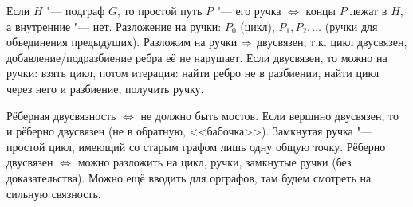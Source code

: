 	Если $H$ "--- подграф $G$, то простой путь $P$ "--- его ручка $\iff$ концы $P$ лежат в $H$, а внутренние "--- нет.
	Разложение на ручки: $P_0$ (цикл), $P_1, P_2, \dots$ (ручки для объединения предыдущих).
	Разложим на ручки $\Rightarrow$ двусвязен, т.к. цикл двусвязен, добавление/подразбиение ребра её не нарушает.
	Если двусвязен, то можно на ручки: взять цикл, потом итерация: найти ребро не в разбиении, найти цикл через него и разбиение, получить ручку.

	Рёберная двусвязность $\iff$ не должно быть мостов.
	Если вершнно двусвязен, то и рёберно двусвязен (не в обратную, <<бабочка>>).
	Замкнутая ручка "--- простой цикл, имеющий со старым графом лишь одну общую точку.
	Рёберно двусвязен $\iff$ можно разложить на цикл, ручки, замкнутые ручки (без доказательства).
	Можно ещё вводить для орграфов, там будем смотреть на сильную связность.
